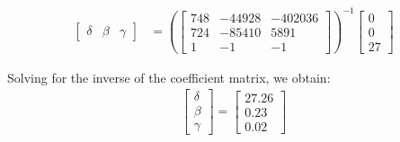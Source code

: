 \documentclass[12pt, oneside]{article}
\begin{document}
\begin{align*}
\begin{bmatrix}
\delta & \beta & \gamma
\end{bmatrix}  &= \left(\begin{bmatrix}
748 & -44928 & -402036   \\
724 & -85410 & 5891 \\
1   & -1     & -1	
\end{bmatrix} \right) ^{-1}
\begin{bmatrix}
0  \\
0   \\
27  
\end{bmatrix}
\end{align*} 

Solving for the inverse of the coefficient matrix, we obtain:
\begin{align*}
\begin{bmatrix}
\delta \\
\beta \\
\gamma
\end{bmatrix} = 
\begin{bmatrix}
27.26    \\
0.23    \\
0.02
\end{bmatrix} 
\end{align*}
  
\end{document}
